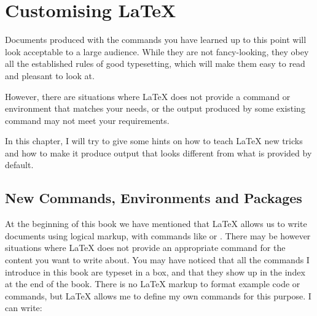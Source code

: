 %
%
%
%

\chapter{Customising \LaTeX}\label{chap:custom}

\begin{intro}
  Documents produced with the commands you have learned up to this
  point will look acceptable to a large audience. While they are not
  fancy-looking, they obey all the established rules of good
  typesetting, which will make them easy to read and pleasant to look at.

  However, there are situations where \LaTeX{} does not provide a
  command or environment that matches your needs, or the output
  produced by some existing command may not meet your requirements.

  In this chapter, I will try to give some hints on
  how to teach \LaTeX{} new tricks and how to make it produce output
  that looks different from what is provided by default.
\end{intro}

\section{New Commands, Environments and Packages}

At the beginning of this book we have mentioned that \LaTeX{} allows us to
write documents using logical markup, with commands like  or . There
may be however situations where \LaTeX{} does not provide an appropriate command for the content you want to write about.
You may have noticed that all the
commands I introduce in this book are typeset in a box, and that they show up
in the index at the end of the book. There is no \LaTeX{} markup to format example code or commands, but \LaTeX{} allows me to define my own commands for this purpose. I
can write:

